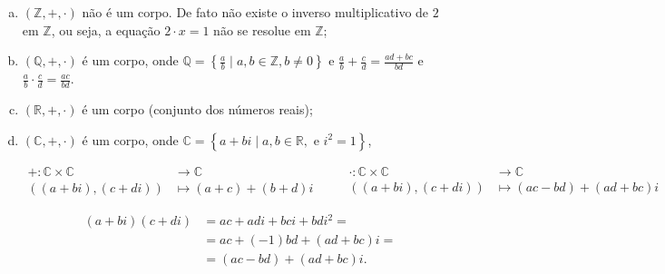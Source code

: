 \begin{example}
	\begin{enumerate}[a)]\leavevmode
		\item

		      $\left(\mathbb{Z},+,\cdot\right)$ não é um corpo.
		      De fato não existe o inverso multiplicativo de $2$ em
		      $\mathbb{Z}$, ou seja, a equação $2\cdot x=1$ não se
		      resolue em $\mathbb{Z}$;

		\item

		      $\left(\mathbb{Q},+,\cdot\right)$ é um corpo, onde
		      \begin{math}
			      \mathbb{Q}=
			      \left\{
			      \frac{a}{b}\mid a,b\in\mathbb{Z},b\neq0
			      \right\}
		      \end{math}
		      e $\frac{a}{b}+\frac{c}{d}=\frac{ad+bc}{bd}$ e
		      $\frac{a}{b}\cdot\frac{c}{d}=\frac{ac}{bd}$.

		\item

		      $\left(\mathbb{R},+,\cdot\right)$ é um corpo (conjunto dos
		      números reais);

		\item

		      $\left(\mathbb{C},+,\cdot\right)$ é um corpo, onde
		      \begin{math}
			      \mathbb{C}=
			      \left\{
			      a+bi\mid a,b\in\mathbb{R},\text{ e }i^{2}=1
			      \right\}
		      \end{math},

		      \[
			      \begin{aligned}
				      +\colon\mathbb{C}\times\mathbb{C}                & \longrightarrow\mathbb{C} \\
				      \left(\left(a+bi\right),\left(c+di\right)\right) & \longmapsto
				      \left(a+c\right)+
				      \left(b+d\right)i
			      \end{aligned}\qquad
			      \begin{aligned}
				      \cdot\colon\mathbb{C}\times\mathbb{C}            & \longrightarrow\mathbb{C} \\
				      \left(\left(a+bi\right),\left(c+di\right)\right) & \longmapsto
				      \left(ac-bd\right)+
				      \left(ad+bc\right)i
			      \end{aligned}
		      \]

		      \begin{align*}
			      \left(a+bi\right)\left(c+di\right)
			       & =ac+adi+bci+bdi^{2}=                       \\
			       & =ac+\left(-1\right)bd+\left(ad+bc\right)i= \\
			       & =\left(ac-bd\right)+\left(ad+bc\right)i.
		      \end{align*}


\end{enumerate}
\end{example}
